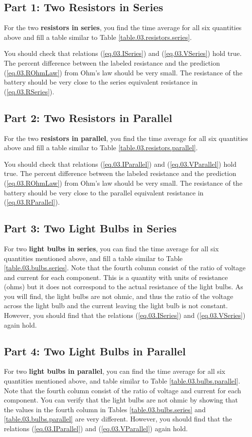 \subsection{Part 1: Two Resistors in Series}
%
For the two \textbf{resistors in series}, you find the time average for all six quantities above and fill a table similar to Table \ref{table.03.resistors.series}.

You should check that relations (\ref{eq.03.ISeries}) and (\ref{eq.03.VSeries}) hold true. The percent difference between the labeled resistance and the prediction (\ref{eq.03.ROhmLaw}) from Ohm's law should be very small. The resistance of the battery should be very close to the series equivalent resistance in (\ref{eq.03.RSeries}).
%
\subsection{Part 2: Two Resistors in Parallel}
%
For the two \textbf{resistors in parallel}, you find the time average for all six quantities above and fill a table similar to Table \ref{table.03.resistors.parallel}.

You should check that relations (\ref{eq.03.IParallel}) and (\ref{eq.03.VParallel}) hold true. The percent difference between the labeled resistance and the prediction (\ref{eq.03.ROhmLaw}) from Ohm's law should be very small. The resistance of the battery should be very close to the parallel equivalent resistance in (\ref{eq.03.RParallel}).
%
\subsection{Part 3: Two Light Bulbs in Series}
%
For two \textbf{light bulbs in series}, you can find the time average for all six quantities mentioned above, and fill a table similar to Table \ref{table.03.bulbs.series}. Note that the fourth column consist of the ratio of voltage and current for each component. This is a quantity with units of resistance (ohms) but it does not correspond to the actual resistance of the light bulbs. As you will find, the light bulbs are not ohmic, and thus the ratio of the voltage across the light bulb and the current leaving the light bulb is not constant. However, you should find that the relations (\ref{eq.03.ISeries}) and (\ref{eq.03.VSeries}) again hold.
%
\subsection{Part 4: Two Light Bulbs in Parallel}
%
For two \textbf{light bulbs in parallel}, you can find the time average for all six quantities mentioned above, and table similar to Table \ref{table.03.bulbs.parallel}. Note that the fourth column consist of the ratio of voltage and current for each component. You can verify that the light bulbs are not ohmic by showing that the values in the fourth column in Tables \ref{table.03.bulbs.series} and \ref{table.03.bulbs.parallel} are very different. However, you should find that the relations (\ref{eq.03.IParallel}) and (\ref{eq.03.VParallel}) again hold.
%
